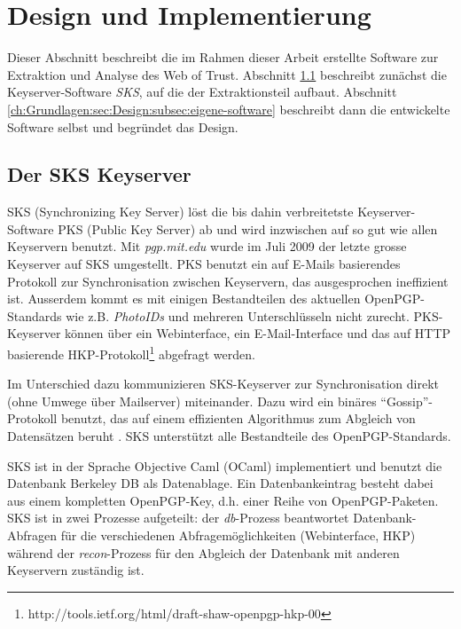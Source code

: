 \section{Design und Implementierung}
\label{ch:Grundlagen:sec:Design}

Dieser Abschnitt beschreibt die im Rahmen dieser Arbeit erstellte
Software zur Extraktion und Analyse des Web of Trust. Abschnitt
\ref{ch:Grundlagen:sec:Design:subsec:der-sks-keyserver} beschreibt
zunächst die Keyserver-Software \emph{SKS}, auf die %
der Extraktionsteil aufbaut. Abschnitt
\ref{ch:Grundlagen:sec:Design:subsec:eigene-software}
beschreibt
dann die entwickelte Software selbst und begründet das Design.

\subsection{Der SKS Keyserver}
\label{ch:Grundlagen:sec:Design:subsec:der-sks-keyserver}

SKS (Synchronizing Key Server) löst die bis dahin verbreitetste
Keyserver-Software PKS (Public Key Server) ab und wird inzwischen auf
so gut wie allen Keyservern benutzt. Mit \emph{pgp.mit.edu} wurde im
Juli 2009 der letzte grosse Keyserver auf SKS umgestellt. PKS benutzt
ein auf E-Mails basierendes Protokoll zur Synchronisation zwischen
Keyservern, das ausgesprochen ineffizient ist. Ausserdem kommt es mit
einigen Bestandteilen des aktuellen OpenPGP-Standards wie
z.B. \emph{PhotoIDs} und mehreren Unterschlüsseln nicht
zurecht. PKS-Keyserver können über ein Webinterface, ein
E-Mail-Interface und das auf HTTP basierende
HKP-Protokoll\footnote{http://tools.ietf.org/html/draft-shaw-openpgp-hkp-00}
abgefragt werden.

Im Unterschied dazu kommunizieren SKS-Keyserver zur Synchronisation
direkt (ohne Umwege über Mailserver) miteinander.  Dazu wird ein
binäres "`Gossip"'-Protokoll benutzt, das auf einem effizienten
Algorithmus zum Abgleich von Datensätzen beruht
\cite{Minsky2003}. SKS unterstützt alle Bestandteile des
OpenPGP-Standards.

SKS ist in der Sprache Objective Caml (OCaml) implementiert und
benutzt die Datenbank Berkeley DB als Datenablage. Ein
Datenbankeintrag besteht dabei aus einem kompletten OpenPGP-Key,
d.h. einer Reihe von OpenPGP-Paketen. SKS ist in zwei Prozesse
aufgeteilt: der \emph{db}-Prozess beantwortet Datenbank-Abfragen für
die verschiedenen Abfragemöglichkeiten (Webinterface, HKP) während der
\emph{recon}-Prozess für den Abgleich der Datenbank mit anderen
Keyservern zuständig ist.

